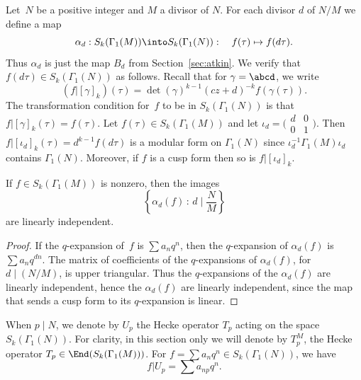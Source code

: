 \documentclass{report}
\begin{document}
Let~$N$ be a positive integer and
$M$ a divisor of $N$. For each divisor $d$ of $N/M$ we define
a map
$$
  \alpha_{d}:S_k(\Gamma_1(M))\into S_k(\Gamma_1(N)):\quad{}
                  f(\tau)\mapsto{}f(d\tau).
$$
Thus $\alpha_d$ is just the map $B_d$ from Section~\ref{sec:atkin}.
We verify that $f(d\tau)\in{}S_k(\Gamma_1(N))$ as follows. Recall that
for $\gamma=\abcd$, we write
$$
  (f|[\gamma]_k)(\tau)=\det(\gamma)^{k-1}(cz+d)^{-k}f(\gamma(\tau)).
$$
The transformation condition for~$f$ to be in $S_k(\Gamma_1(N))$
is that $f|[\gamma]_k(\tau)=f(\tau)$.  Let $f(\tau)\in{}S_k(\Gamma_1(M))$ and let
$\iota_d=\bigl(\begin{smallmatrix}d&0\\0&1\end{smallmatrix}\bigr)$. Then
$f|[\iota_d]_k(\tau)=d^{k-1}f(d\tau)$ is a modular form on
$\Gamma_1(N)$ since $\iota_d^{-1}\Gamma_1(M)\iota_d$ contains
$\Gamma_1(N)$. Moreover, if $f$ is a cusp form then so is $f|[\iota_d]_k$.

\begin{proposition}\label{prop:alpha_indep}
If $f\in S_k(\Gamma_1(M))$ is nonzero, then the images
$$\left\{\alpha_d(f) \,:\, d\mid \frac{N}{M}\right\}$$
are linearly independent.
\end{proposition}
\begin{proof}
If the $q$-expansion of~$f$ is $\sum a_n q^n$, then the $q$-expansion
of $\alpha_d(f)$ is $\sum a_n q^{dn}$.      The matrix of coefficients
of the $q$-expansions of $\alpha_d(f)$, for $d\mid (N/M)$, is upper
triangular.   Thus the $q$-expansions of the $\alpha_d(f)$ are linearly
independent, hence the $\alpha_d(f)$ are linearly independent, since the
map that sends a cusp form to its $q$-expansion is linear.
\end{proof}

When $p\mid N$, we denote by $U_p$ the Hecke operator $T_p$ acting
on the space $S_k(\Gamma_1(N))$.  For clarity, in this
section only we will denote by $T_{p}^M$, the Hecke operator $T_p\in
\End(S_k(\Gamma_1(M)))$. For $f=\sum a_n q^n\in S_k(\Gamma_1(N))$,
we have
$$
  f|U_p = \sum a_{np} q^n.
$$
\end{document}
